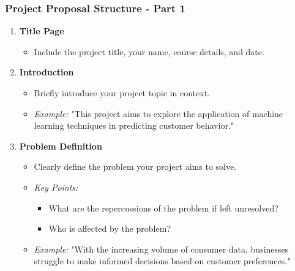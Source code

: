 \documentclass[aspectratio=169]{beamer}
\begin{document}
\begin{frame}[fragile]
  \frametitle{Project Proposal Structure - Part 1}
  \begin{enumerate}
    \item \textbf{Title Page}
    \begin{itemize}
      \item Include the project title, your name, course details, and date.
    \end{itemize}

    \item \textbf{Introduction}
    \begin{itemize}
      \item Briefly introduce your project topic in context.
      \item \textit{Example:} "This project aims to explore the application of machine learning techniques in predicting customer behavior."
    \end{itemize}

    \item \textbf{Problem Definition}
    \begin{itemize}
      \item Clearly define the problem your project aims to solve.
      \item \textit{Key Points:}
      \begin{itemize}
        \item What are the repercussions of the problem if left unresolved?
        \item Who is affected by the problem?
      \end{itemize}
      \item \textit{Example:} "With the increasing volume of consumer data, businesses struggle to make informed decisions based on customer preferences."
    \end{itemize}
  \end{enumerate}
\end{frame}
\end{document}
